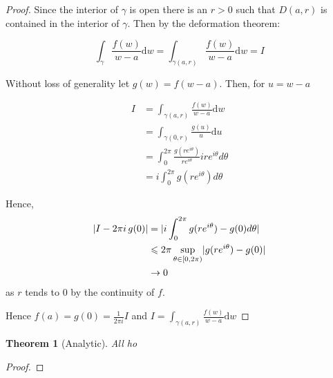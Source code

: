 \documentclass[11pt,a4paper, titlepage]{article}
\newtheorem{theorem}{Theorem}[section]
\DeclarePairedDelimiter\abs{\lvert}{\rvert}
\theoremstyle{definition}
\begin{document}
\begin{proof}

Since the interior of $\gamma$ is open there is an $r > 0$ such that $D(a,r)$ is contained in the interior of $\gamma$. Then by the deformation theorem:

\[
	\int_\gamma \frac{f(w)}{w-a} \mathrm{d}w = \int_{\gamma(a,r)} \frac{f(w)}{w-a} \mathrm{d}w = I
\]

Without loss of generality let $g(w) = f(w - a)$. Then, for $u = w - a$


\begin{align*}
	I &= \int_{\gamma(a,r)} \frac{f(w)}{w-a} \mathrm{d}w \\
	  &= \int_{\gamma(0,r)} \frac{g(u)}{u} \mathrm{d}u \\
	  &= \int_0^{2\pi} \frac{g(re^{i \theta})}{re^{i \theta}} i r e^{i \theta} d \theta \\
	  &= i \int_0^{2\pi} g(re^{i \theta}) d \theta 
\end{align*}

Hence, 
\begin{align*}
\abs{I - 2 \pi i \, g(0)} &= \abs{i \int_0^{2\pi} g(re^{i \theta}) - g(0) d \theta} \\
					      &\leqslant 2 \pi  \sup_{\theta \in [0,2 \pi)} \abs{g(re^{i \theta}) - g(0)}  \\
					      & \rightarrow 0 
\end{align*}
as $r$ tends to $0$ by the continuity of $f$.

Hence $f(a) = g(0) = \frac{1}{2 \pi i} I$ and $I = \int_{\gamma(a,r)} \frac{f(w)}{w-a} \mathrm{d}w$

\end{proof}

\begin{theorem}[Analytic]

All ho

\end{theorem}

\begin{proof}


\end{proof}
\end{document}
